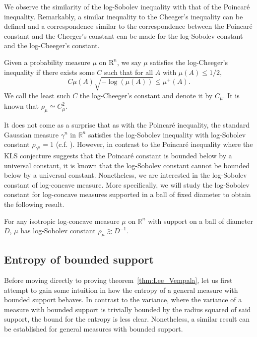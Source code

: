 We observe the similarity of the log-Sobolev inequality with that of the Poincaré inequality. Remarkably, 
a similar inequality to the Cheeger's inequality can be defined and a correspondence similar to the correspondence 
between the Poincaré constant and the Cheeger's constant can be made for the log-Sobolev constant and the 
log-Cheeger's constant.

\begin{definition}
  Given a probability measure \(\mu\) on \(\mbox{R}^n\), we say \(\mu\) satisfies the log-Cheeger's inequality 
  if there exists some \(C\) such that for all \(A\) with \(\mu(A) \le 1 / 2\),
  \[C\mu(A)\sqrt{-\log(\mu(A))} \le \mu^+(A).\]
  We call the least such \(C\) the log-Cheeger's constant and denote it by \(C_\mu\). It is known that \(\rho_\mu \simeq C_\mu^2\). 
\end{definition}
  
It does not come as a surprise that as with the Poincaré inequality, the standard Gaussian measure 
\(\gamma^n\) in \(\mathbb{R}^n\) satisfies the log-Sobolev inequality with log-Sobolev constant 
\(\rho_{\gamma^n} = 1\) (c.f. \cite{Gross_1975}). However, in contrast to the Poincaré inequality where 
the KLS conjecture suggests that the Poincaré constant is bounded below by a universal constant, it is known 
that the log-Sobolev constant cannot be bounded below by a universal constant. Nonetheless, we are 
interested in the log-Sobolev constant of log-concave measure. More specifically, we will study the 
log-Sobolev constant for log-concave measures supported in a ball of fixed diameter to obtain the 
following result.

\begin{theorem}\label{thm:Lee_Vempala}
  For any isotropic log-concave measure \(\mu\) on \(\mathbb{R}^n\) with support on a ball of diameter \(D\), 
  \(\mu\) has log-Sobolev constant \(\rho_\mu \gtrsim D^{-1}\).
\end{theorem}

\subsection{Entropy of bounded support}

Before moving directly to proving theorem~\ref{thm:Lee_Vempala}, let us first attempt to gain some intuition 
in how the entropy of a general measure with bounded support behaves. In contrast to the variance, 
where the variance of a measure with bounded support is trivially bounded by the radius squared of 
said support, the bound for the entropy is less clear. Nonetheless, a similar result can be established 
for general measures with bounded support.

